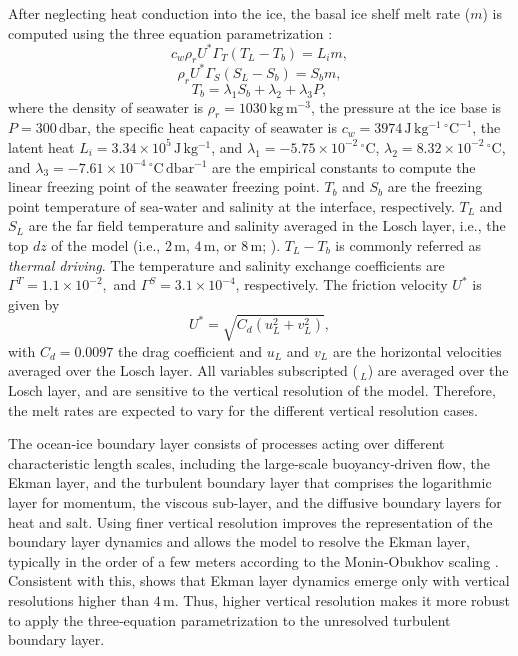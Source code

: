 \documentclass[draft]{agujournal2019}
\begin{document}
After neglecting heat conduction into the ice, the basal ice shelf melt rate ($m$) is computed using the three equation parametrization \citep{Holland_Modeling_1999}:
\begin{equation}
      c_w \rho_r U^* \Gamma_T \left(T_L - T_b \right) = L_i m, 
      \label{eq:3eq1}
\end{equation}
\begin{equation}
      \rho_r U^* \Gamma_S \left(S_L - S_b \right) = S_b m, 
      \label{eq:3eq2}
\end{equation}
\begin{equation}
      T_b = \lambda_1 S_b + \lambda_2 + \lambda_3 P,
      \label{eq:3eq3}
\end{equation}
where the density of seawater is $\rho_r=1030\,\mathrm{kg\, m^{-3}}$, the pressure at the ice base is $P=300\,\mathrm{dbar}$, the specific heat capacity of seawater is $c_w=3974\,\mathrm{J\, kg^{-1}\,^\circ C^{-1}}$, the latent heat $L_i= 3.34\times 10^5\,\mathrm{J\, kg^{-1}}$, and $\lambda_1 = -5.75\times 10 ^{-2}\,^\circ \mathrm{C}$, $\lambda_2 = 8.32\times 10^{-2}\,^\circ \mathrm{C}$, and $\lambda_3 = -7.61\times10^{-4}\,^\circ \mathrm{C\, dbar^{-1}}$ are the empirical constants to compute the linear freezing point of the seawater freezing point. 
$T_b$ and $S_b$ are the freezing point temperature of sea-water and salinity at the interface, respectively. $T_L$ and $S_L$ are the far field temperature and salinity averaged in the Losch layer, i.e., the top $dz$ of the model (i.e., $2\,\mathrm{m}$, $4\,\mathrm{m}$, or $8\,\mathrm{m}$; \citealt{Losch_Modeling_2008}). $T_L - T_b$ is commonly referred as \emph{thermal driving}. The temperature and salinity exchange coefficients are $\Gamma^{T} = 1.1\times10^{-2},$ and $\Gamma^{S} = 3.1\times10^{-4}$, respectively. The friction velocity $U^*$ is given by
\begin{equation}
U^* = \sqrt{C_d (u_L^2 + v_L^2)},
\label{eq:ustar}
\end{equation}
with $C_d=0.0097$ the drag coefficient and $u_L$ and $v_L$ are the horizontal velocities averaged over the Losch layer. All variables subscripted ($\,_L$) are averaged over the Losch layer, and are sensitive to the vertical resolution of the model. Therefore, the melt rates are expected to vary for the different vertical resolution cases. 

The ocean-ice boundary layer consists of processes acting over different characteristic length scales, including the large-scale buoyancy‑driven flow, the Ekman layer, and the turbulent boundary layer that comprises the logarithmic layer for momentum, the viscous sub-layer, and the diffusive boundary layers for heat and salt. Using finer vertical resolution improves the representation of the boundary layer dynamics and allows the model to resolve the Ekman layer, typically in the order of a few meters according to the Monin-Obukhov scaling \citep{Vreugdenhil_Ocean_2022}. Consistent with this, \citet{Patmore_Turbulence_2023} shows that Ekman layer dynamics emerge only with vertical resolutions higher than $4\,\mathrm{m}$. Thus, higher vertical resolution makes it more robust to apply the three‑equation parametrization to the unresolved turbulent boundary layer. 
\end{document}
